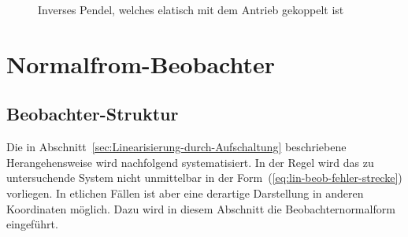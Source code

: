 \begin{figure}
\begin{centering}
\resizebox{0.4\textwidth}{!}{}
\par\end{centering}
\caption{Inverses Pendel, welches elatisch mit dem Antrieb gekoppelt ist\label{fig:Inverses-Pendel-elastisch}}
\end{figure}


\section{Normalfrom-Beobachter\label{sec:Normal-Form-Observer}}

\subsection{Beobachter-Struktur}

Die in Abschnitt~\ref{sec:Linearisierung-durch-Aufschaltung} beschriebene
Herangehensweise wird nachfolgend systematisiert. In der Regel wird
das zu untersuchende System nicht unmittelbar in der Form~(\ref{eq:lin-beob-fehler-strecke})
vorliegen. In etlichen Fällen ist aber eine derartige Darstellung
in anderen Koordinaten möglich. Dazu wird in diesem Abschnitt die
Beobachternormalform eingeführt.

